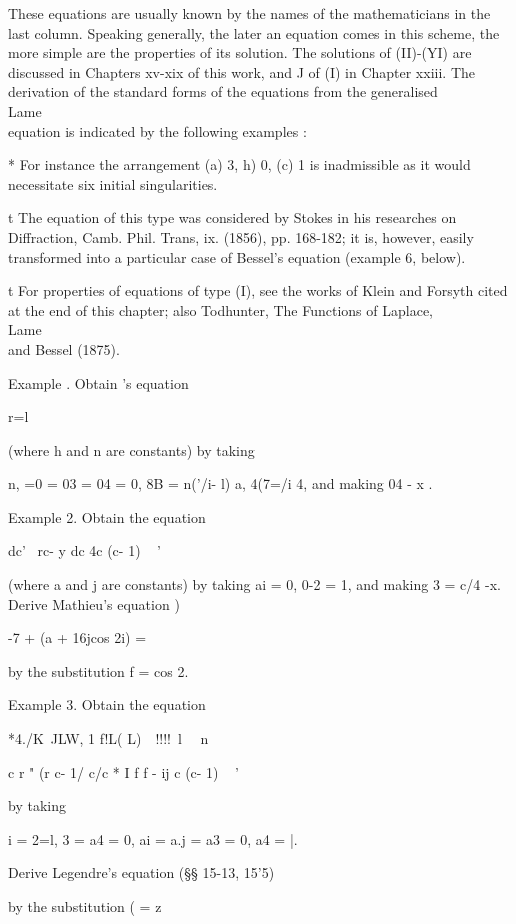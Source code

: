 These equations are usually known by the names of the mathematicians
in the last column. Speaking generally, the later an equation comes in
this scheme, the more simple are the properties of its solution. The
solutions of (II)-(YI) are discussed in Chapters xv-xix of this work,
and J of (I) in Chapter xxiii. The derivation of the standard forms of
the equations from the generalised \\Lame\\ equation is indicated by the
following examples :

* For instance the arrangement (a) 3, h) 0, (c) 1 is inadmissible as
it would necessitate six initial singularities.

t The equation of this type was considered by Stokes in his researches
on Diffraction, Camb. Phil. Trans, ix. (1856), pp. 168-182; it is,
however, easily transformed into a particular case of Bessel's
equation (example 6, below).

t For properties of equations of type (I), see the works of Klein and
Forsyth cited at the end of this chapter; also Todhunter, The
Functions of Laplace, \\Lame\\ and Bessel (1875).

%
%

Example . Obtain \Lame's equation

r=l

(where h and n are constants) by taking

n, =0 = 03 = 04 = 0, 8B = n('/i- l) a, 4(7=/i 4, and making 04 - x .

Example 2. Obtain the equation

dc' \ rc- y dc 4c (c- 1) ~ '

(where a and j are constants) by taking ai = 0, 0-2 = 1, and making 3
= c/4 -x. Derive Mathieu's equation )

-7 + (a + 16jcos 2i) =

by the substitution f = cos 2.

Example 3. Obtain the equation

 *4./K\ JLW, 1 f!L( L)\ \ !!!!\ l \ \ n

c r " (r c- 1/ c/c * I f f - ij c (c- 1) ~ '

by taking

 i = 2=l, 3 = a4 = 0, ai = a.j = a3 = 0, a4 = |.

Derive Legendre's equation (§§ 15-13, 15'5)

by the substitution ( = z~\

